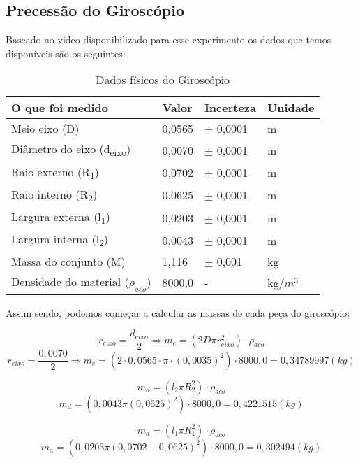 \subsection{Precessão do Giroscópio}

Baseado no video disponibilizado para esse experimento os dados que temos disponíveis são os seguintes:

\begin{table}[H]
    \centering
    \begin{tabular}{ |M{5cm}||M{2cm}||M{2cm}||M{2cm}|  }
        \hline
        \textbf{O que foi medido} & \textbf{Valor} & \textbf{Incerteza} & \textbf{Unidade}\\
        \hline
        Meio eixo (D)                               & 0,0565    & $\pm$ 0,0001  & m\\
        Diâmetro do eixo (d\textsubscript{eixo})    & 0,0070    & $\pm$ 0,0001  & m\\
        Raio externo (R\textsubscript{1})           & 0,0702    & $\pm$ 0,0001  & m\\
        Raio interno (R\textsubscript{2})           & 0,0625    & $\pm$ 0,0001  & m\\
        Largura externa (l\textsubscript{1})        & 0,0203    & $\pm$ 0,0001  & m\\
        Largura interna (l\textsubscript{2})        & 0,0043    & $\pm$ 0,0001  & m\\
        Massa do conjunto (M)                       & 1,116     & $\pm$ 0,001   & kg\\
        Densidade do material ($\rho _{aco}$)       & 8000,0    & -             & kg/$m^3$\\
        \hline
    \end{tabular}
    \caption{Dados físicos do Giroscópio}
\end{table}

Assim sendo, podemos começar a calcular as massas de cada peça do giroscópio:

\[ r_{eixo} = \frac{d_{eixo}}{2} \Rightarrow m_e = (2 D \pi r_{eixo}^2) \cdot \rho_{aco} \]
\[ r_{eixo} = \frac{0,0070}{2} \Rightarrow m_e = (2 \cdot 0,0565 \cdot \pi \cdot (0,0035)^2) \cdot 8000,0 = 0,34789997 (kg)\]

\[ m_d = (l_2 \pi R_2^2) \cdot \rho_{aco} \]
\[ m_d = (0,0043 \pi (0,0625)^2) \cdot 8000,0 = 0,4221515 (kg) \]

\[ m_a = (l_1 \pi R_1^2) \cdot \rho_{aco} \]
\[ m_a = (0,0203 \pi (0,0702 - 0,0625)^2) \cdot 8000,0 = 0,302494 (kg) \]

